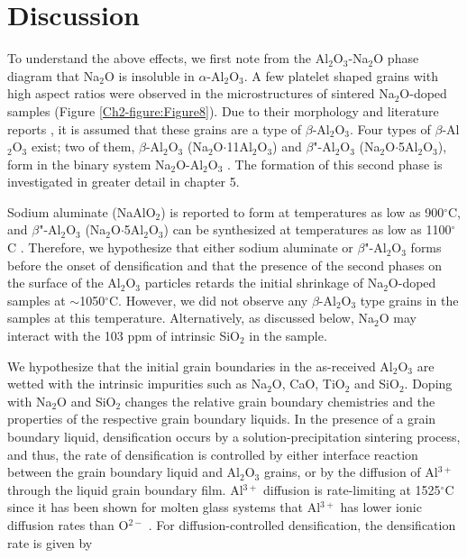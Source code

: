 \section{Discussion}

To understand the above effects, we first note from the Al$_{2}$O$_{3}$-Na$_{2}$O phase diagram \cite{Lambotte2013a} that Na$_{2}$O is insoluble in $\alpha$-Al$_{2}$O$_{3}$. A few platelet shaped grains with high aspect ratios were observed in the microstructures of sintered Na$_{2}$O-doped samples (Figure \ref{Ch2-figure:Figure8}). Due to their morphology and literature reports \cite{Brownmiller1932a,PABLOGALAN1959,Rankin1916,Ridgway1936,Duncan1969a}, it is assumed that these grains are a type of $\beta$-Al$_{2}$O$_{3}$. Four types of $\beta$-Al$_{2}$O$_{3}$ exist; two of them, $\beta$-Al$_{2}$O$_{3}$ (Na$_{2}$O$\cdot$11Al$_{2}$O$_{3}$) and $\beta$"-Al$_{2}$O$_{3}$ (Na$_{2}$O$\cdot$5Al$_{2}$O$_{3}$), form in the binary system Na$_{2}$O-Al$_{2}$O$_{3}$ \cite{Sutorik1998,Stevens1984}. The formation of this second phase is investigated in greater detail in chapter 5. 

Sodium aluminate (NaAlO$_{2}$) is reported to form at temperatures as low as 900$^{\circ}$C,\cite{Christie1978} and $\beta$"-Al$_{2}$O$_{3}$ (Na$_{2}$O$\cdot$5Al$_{2}$O$_{3}$) can be synthesized at temperatures as low as 1100$^{\circ}$C \cite{Brownmiller1932a,Kummer1972a,Vries1969}. Therefore, we hypothesize that either sodium aluminate or $\beta$"-Al$_{2}$O$_{3}$ forms before the onset of densification and that the presence of the second phases on the surface of the Al$_{2}$O$_{3}$ particles retards the initial shrinkage of Na$_{2}$O-doped samples at $\sim$1050$^{\circ}$C.  However, we did not observe any $\beta$-Al$_{2}$O$_{3}$ type grains in the samples at this temperature. Alternatively, as discussed below, Na$_{2}$O may interact with the 103 ppm of intrinsic SiO$_{2}$ in the sample.

We hypothesize that the initial grain boundaries in the as-received Al$_{2}$O$_{3}$ are wetted with the intrinsic impurities such as Na$_{2}$O, CaO, TiO$_{2}$ and SiO$_{2}$. Doping with Na$_{2}$O and SiO$_{2}$ changes the relative grain boundary chemistries and the properties of the respective grain boundary liquids. In the presence of a grain boundary liquid, densification occurs by a solution-precipitation sintering process, and thus, the rate of densification is controlled by either interface reaction between the grain boundary liquid and Al$_{2}$O$_{3}$ grains, or by the diffusion of Al$^{3+}$ through the liquid grain boundary film. Al$^{3+}$ diffusion is rate-limiting at 1525$^{\circ}$C since it has been shown for molten glass systems that Al$^{3+}$ has lower ionic diffusion rates than O$^{2-}$ \cite{Terai1975}. For diffusion-controlled densification, the densification rate is given by \cite{Kwon1990,Kwon1991}

